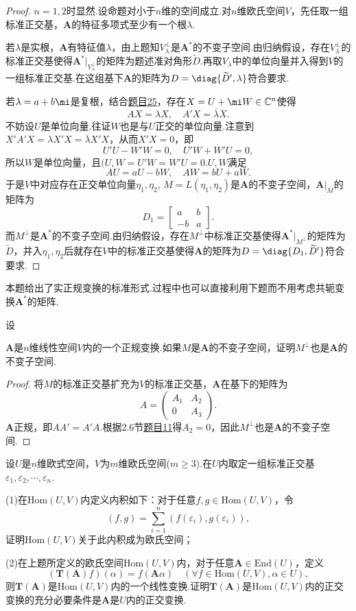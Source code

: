\begin{proof}
	$n=1,2$时显然.设命题对小于$n$维的空间成立.对$n$维欧氏空间$V$，先任取一组标准正交基，$\bm A$的特征多项式至少有一个根$\lambda$.

	若$\lambda$是实根，$\bm A$有特征值$\lambda$，由上题知$V_{\lambda}^\perp$是$\bm A^*$的不变子空间.由归纳假设，存在$V_{\lambda}^\perp$的标准正交基使得$\bm A^*|_{V_\lambda^\perp}$的矩阵为题述准对角形$\widetilde{D}$.再取$V_{\lambda}$中的单位向量并入得到$V$的一组标准正交基.在这组基下$\bm A$的矩阵为$D=\diag{\widetilde{D}',\lambda}$符合要求.

	若$\lambda=a+b\mi$是复根，结合\hyperlink{LemmaOfNormalTransformation}{题目25}，存在$X=U+\mi W\in\mathbb{C}^n$使得
	\[
		AX=\lambda X,\quad A'X=\overline{\lambda}X.
	\]
	不妨设$U$是单位向量.往证$W$也是与$U$正交的单位向量.注意到$X'A'X=\lambda X'X=\overline{\lambda}X'X$，从而$X'X=0$，即
	\[
		U'U-W'W=0,\quad U'W+W'U=0,
	\]
	所以$W$是单位向量，且$(U,W=U'W=W'U=0$.$U,W$满足
	\[
		AU=aU-bW,\quad AW=bU+aW.
	\]
	于是$V$中对应存在正交单位向量$\eta_1,\eta_2,\,M=L(\eta_1,\eta_2)$是$\bm A$的不变子空间，$\bm A|_M$的矩阵为
	\[
		D_1=\begin{bmatrix}
			a  & b \\
			-b & a
		\end{bmatrix}.
	\]
	而$M^\perp$是$\bm A^*$的不变子空间.由归纳假设，存在$M^\perp$中标准正交基使得$\bm A^*|_{M^\perp}$的矩阵为$\widetilde{D}$，并入$\eta_1,\eta_2$后就存在$V$中的标准正交基使得$\bm A$的矩阵为$D=\diag{D_1,\widetilde{D}'}$符合要求.
\end{proof}
\begin{note}
	本题给出了实正规变换的标准形式.过程中也可以直接利用下题而不用考虑共轭变换$\bm A^*$的矩阵.
\end{note}
\begin{prob}[28]
	\hypertarget{NormalTansformationInvariantSubspace}{设}$\bm A$是$n$维线性空间$V$内的一个正规变换.如果$M$是$\bm A$的不变子空间，证明$M^\perp$也是$\bm A$的不变子空间.
\end{prob}
\begin{proof}
	将$M$的标准正交基扩充为$V$的标准正交基，$\bm A$在基下的矩阵为
	\[
		A=\begin{pmatrix}
			A_1 & A_2 \\
			0   & A_3
		\end{pmatrix}.
	\]
	$\bm A$正规，即$AA'=A'A$.根据2.6节\hyperlink{LemmaOfNormalTransformationSubspace}{题目11}得$A_2=0$，因此$M^\perp$也是$\bm A$的不变子空间.
\end{proof}
\begin{prob}[29]
	设$U$是$n$维欧式空间，$V$为$m$维欧氏空间($m\ge 3$).在$U$内取定一组标准正交基$\varepsilon_1,\varepsilon_2,\cdots,\varepsilon_n$.

	(1)在$\mathrm{Hom}(U,V)$内定义内积如下：对于任意$f,g\in\mathrm{Hom}(U,V)$，令
	\[
		(f,g)=\sum_{i=1}^n(f(\varepsilon_i),g(\varepsilon_i)),
	\]
	证明$\mathrm{Hom}(U,V)$关于此内积成为欧氏空间；

	(2)在上题所定义的欧氏空间$\mathrm{Hom}(U,V)$内，对于任意$\bm A\in\mathrm{End}(U)$，定义
	\[
		(\bm T(\bm A)f)(\alpha)=f(\bm A\alpha)\quad(\forall f\in\mathrm{Hom}(U,V),\alpha\in U),
	\]
	则$\bm T(\bm A)$是$\mathrm{Hom}(U,V)$内的一个线性变换.证明$\bm T(\bm A)$是$\mathrm{Hom}(U,V)$内的正交变换的充分必要条件是$\bm A$是$U$内的正交变换.
\end{prob}
